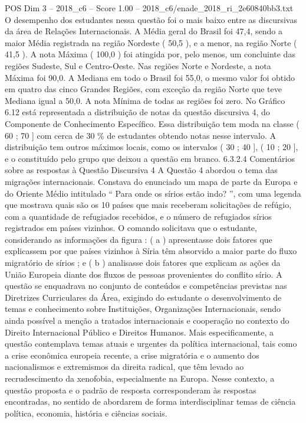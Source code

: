 \begin{textsample}{POS Dim 3 – 2018\_c6 – Score 1.00 – 2018\_c6/enade\_2018\_ri\_2e60840bb3.txt}
O desempenho dos estudantes nessa questão foi o mais baixo entre as discursivas da área de Relações Internacionais.
A Média geral do Brasil foi 47,4, sendo a maior Média registrada na região Nordeste ( 50,5 ), e a menor, na região Norte ( 41,5 ).
A nota Máxima ( 100,0 ) foi atingida por, pelo menos, um concluinte das regiões Sudeste, Sul e Centro-Oeste.
Nas regiões Norte e Nordeste, a nota Máxima foi 90,0.
A Mediana em todo o Brasil foi 55,0, o mesmo valor foi obtido em quatro das cinco Grandes Regiões, com exceção da região Norte que teve Mediana igual a 50,0.
A nota Mínima de todas as regiões foi zero.
No Gráfico 6.12 está representada a distribuição de notas da questão discursiva 4, do Componente de Conhecimento Específico.
Essa distribuição tem moda na classe ( 60 ; 70 ] com cerca de 30 \% de estudantes obtendo notas nesse intervalo.
A distribuição tem outros máximos locais, como os intervalos ( 30 ; 40 ], ( 10 ; 20 ], e o constituído pelo grupo que deixou a questão em branco. 6.3.2.4 Comentários sobre as respostas à Questão Discursiva 4 A Questão 4 abordou o tema das migrações internacionais.
Constava do enunciado um mapa de parte da Europa e do Oriente Médio intitulado “ Para onde os sírios estão indo? ”, com uma legenda que mostrava quais são os 10 países que mais receberam solicitações de refúgio, com a quantidade de refugiados recebidos, e o número de refugiados sírios registrados em países vizinhos.
O comando solicitava que o estudante, considerando as informações da figura : ( a ) apresentasse dois fatores que explicassem por que países vizinhos à Síria têm absorvido a maior parte do fluxo migratório de sírios ; e ( b ) analisasse dois fatores que explicam as ações da União Europeia diante dos fluxos de pessoas provenientes do conflito sírio.
A questão se enquadrava no conjunto de conteúdos e competências previstas nas Diretrizes Curriculares da Área, exigindo do estudante o desenvolvimento de temas e conhecimento sobre Instituições, Organizações Internacionais, sendo ainda possível a menção a tratados internacionais e cooperação no contexto do Direito Internacional Público e Direitos Humanos.
Mais especificamente, a questão contemplava temas atuais e urgentes da política internacional, tais como a crise econômica europeia recente, a crise migratória e o aumento dos nacionalismos e extremismos da direita radical, que têm levado ao recrudescimento da xenofobia, especialmente na Europa.
Nesse contexto, a questão proposta e o padrão de resposta corresponderam às respostas encontradas, no sentido de abordarem de forma interdisciplinar temas de ciência política, economia, história e ciências sociais.

\end{textsample}
